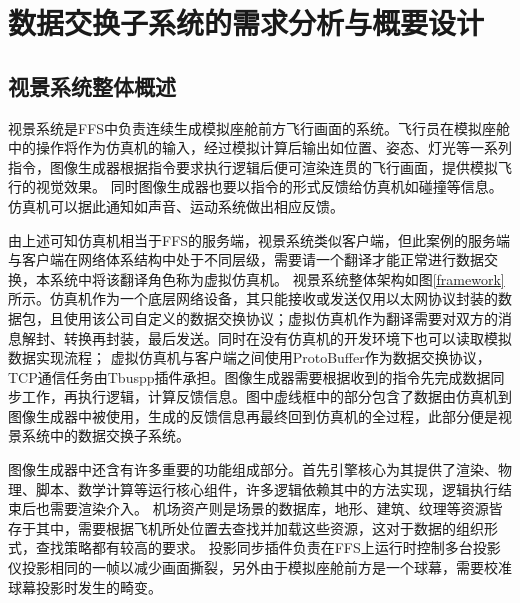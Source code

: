 \chapter{数据交换子系统的需求分析与概要设计}
\section{视景系统整体概述}
视景系统是FFS中负责连续生成模拟座舱前方飞行画面的系统。飞行员在模拟座舱中的操作将作为仿真机的输入，经过模拟计算后输出如位置、姿态、灯光等一系列指令，图像生成器根据指令要求执行逻辑后便可渲染连贯的飞行画面，提供模拟飞行的视觉效果。
同时图像生成器也要以指令的形式反馈给仿真机如碰撞等信息。仿真机可以据此通知如声音、运动系统做出相应反馈。
\par
由上述可知仿真机相当于FFS的服务端，视景系统类似客户端，但此案例的服务端与客户端在网络体系结构中处于不同层级，需要请一个翻译才能正常进行数据交换，本系统中将该翻译角色称为虚拟仿真机。
视景系统整体架构如图\ref{framework}所示。仿真机作为一个底层网络设备，其只能接收或发送仅用以太网协议封装的数据包，且使用该公司自定义的数据交换协议；虚拟仿真机作为翻译需要对双方的消息解封、转换再封装，最后发送。同时在没有仿真机的开发环境下也可以读取模拟数据实现流程；
虚拟仿真机与客户端之间使用ProtoBuffer作为数据交换协议，TCP通信任务由Tbuspp插件承担。图像生成器需要根据收到的指令先完成数据同步工作，再执行逻辑，计算反馈信息。图中虚线框中的部分包含了数据由仿真机到图像生成器中被使用，生成的反馈信息再最终回到仿真机的全过程，此部分便是视景系统中的数据交换子系统。
\par
图像生成器中还含有许多重要的功能组成部分。首先引擎核心为其提供了渲染、物理、脚本、数学计算等运行核心组件，许多逻辑依赖其中的方法实现，逻辑执行结束后也需要渲染介入。
机场资产则是场景的数据库，地形、建筑、纹理等资源皆存于其中，需要根据飞机所处位置去查找并加载这些资源，这对于数据的组织形式，查找策略都有较高的要求。
投影同步插件负责在FFS上运行时控制多台投影仪投影相同的一帧以减少画面撕裂，另外由于模拟座舱前方是一个球幕，需要校准球幕投影时发生的畸变。

